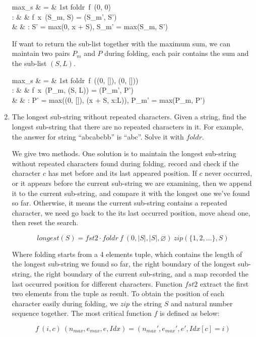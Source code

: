 \documentclass[UTF8]{article}
\begin{document}
\begin{enumerate}
\blre
max_s & = & 1st \cdot foldr\ f\ (0, 0) \\
: & & f\ x\ (S_m, S) = (S_m', S') \\
& & :  S' = max(0, x + S), S_m' = max(S_m, S') \\
\elre

If want to return the sub-list together with the maximum sum, we can maintain two pairs $P_m$ and $P$ during folding, each pair contains the sum and the sub-list $(S, L)$.

\blre
max_s & = & 1st \cdot foldr\ f\ ((0, []), (0, [])) \\
: & & f\ x\ (P_m, (S, L)) = (P_m', P') \\
& & :  P' = max((0, []), (x + S, x:L)), P_m' = max(P_m, P') \\
\elre

\item The longest sub-string without repeated characters. Given a string, find the longest sub-string that there are no repeated characters in it. For example, the answer for string ``abcabcbb'' is ``abc''. Solve it with $foldr$.

We give two methods. One solution is to maintain the longest sub-string without repeated characters found during folding, record and check if the character $c$ has met before and its last appeared position. If $c$ never occurred, or it appears before the current sub-string we are examining, then we append it to the current sub-string, and compare it with the longest one we've found so far. Otherwise, it means the current sub-string contains a repeated character, we need go back to the its last occurred position, move ahead one, then reset the search.

\[
longest(S) = fst2 \cdot foldr\ f\ (0, |S|, |S|, \varnothing)\ zip(\{1, 2, ...\}, S)
\]

Where folding starts from a 4 elements tuple, which contains the length of the longest sub-string we found so far, the right boundary of the longest sub-string, the right boundary of the current sub-string, and a map recorded the last occurred position for different characters. Function $fst2$ extract the first two elements from the tuple as result. To obtain the position of each character easily during folding, we $zip$ the string $S$ and natural number sequence together. The most critical function $f$ is defined as below:

\[
f\ (i, c)\ (n_{max}, e_{max}, e, Idx) = (n_{max}', e_{max}', e', Idx[c] = i)
\]


\end{enumerate}
\end{document}

